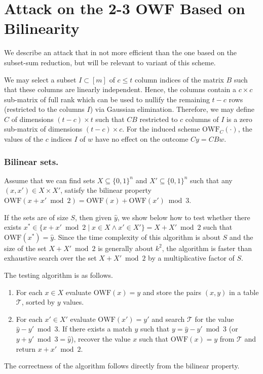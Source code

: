 \documentclass[orivec,envcountsect]{llncs}
\newcommand{\OWF}{\text{OWF}}
\begin{document}
\section{Attack on the 2-3 OWF Based on Bilinearity}
\label{app:bilinearity}

We describe an attack that in not more efficient than the one based on the subset-sum reduction, but will be relevant to variant of this scheme.


We may select a subset $I \subset [m]$ of $c \leq t$ column indices of the matrix $B$ such that these columns are linearly independent. Hence, the columns contain a $c \times c$ sub-matrix of full rank which can be used to nullify the remaining $t-c$ rows (restricted to the columns $I$) via Gaussian elimination. Therefore, we may define $C$ of dimensions $(t-c) \times t$ such that $CB$ restricted to $c$ columns of $I$ is a zero sub-matrix of dimensions $(t-c) \times c$. For the induced scheme $\OWF_C(\cdot)$, the values of the $c$ indices $I$ of $w$ have no effect on the outcome $Cy = CBw$.


\subsubsection{Bilinear sets.}

Assume that we can find sets $X \subseteq \{0,1\}^n$ and $X' \subseteq \{0,1\}^n$ such that any $(x,x')\in X \times X'$, satisfy the bilinear property $\OWF(x + x' \bmod 2) = \OWF(x) + \OWF(x') \bmod 3$.

If the sets are of size $S$, then given $\hat{y}$, we show below how to test whether there exists $x^{*} \in \{x + x' \bmod 2 \mid x \in X \wedge x' \in X'\} = X + X' \bmod 2$ such that $\OWF(x^{*}) = \hat{y}$. Since the time complexity of this algorithm is about $S$ and the size of the set $X + X' \bmod 2$ is generally about $k^2$, the algorithm is faster than exhaustive search over the set $X + X' \bmod 2$ by a multiplicative factor of $S$.

The testing algorithm is as follows.
\begin{enumerate}
  \item For each $x \in X$ evaluate $\OWF(x) = y$ and store the pairs $(x,y)$ in a table $\mathcal{T}$, sorted by $y$ values.
  \item For each $x' \in X'$ evaluate $\OWF(x') = y'$ and search $\mathcal{T}$ for the value $\hat{y} - y' \bmod 3$. If there exists a match $y$ such that $y = \hat{y} - y' \bmod 3$ (or $y + y' \bmod 3 = \hat{y}$), recover the value $x$ such that $\OWF(x) = y$ from $\mathcal{T}$ and return $x + x' \bmod 2$.
\end{enumerate}
The correctness of the algorithm follows directly from the bilinear property.
\end{document}
